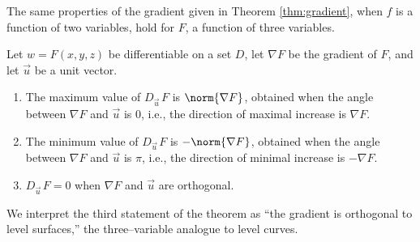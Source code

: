 The same properties of the gradient given in Theorem \ref{thm:gradient}, when $f$ is a function of two variables, hold for $F$, a function of three variables.

\enlargethispage{2\baselineskip}
{Let $w=F(x,y,z)$ be differentiable on a set $D$, let $\nabla F$ be the gradient of $F$, and let $\vec u$ be a unit vector.
\begin{enumerate}
	\item The maximum value of $D_{\vec u\,}F$ is $\norm{\nabla F}$, obtained when the angle between $\nabla F$ and $\vec u$ is 0, i.e.,  the direction of maximal increase is $\nabla F$.
	\item The minimum value of $D_{\vec u\,}F$ is $-\norm{\nabla F}$, obtained when the angle between $\nabla F$ and $\vec u$ is $\pi$, i.e., the direction of minimal increase is $-\nabla F$.
	\item $D_{\vec u\,}F = 0$ when $\nabla F$ and $\vec u$ are orthogonal.
\end{enumerate}
}

We interpret the third statement of the theorem as ``the gradient is orthogonal to level surfaces,'' the three--variable analogue to level curves.\\

